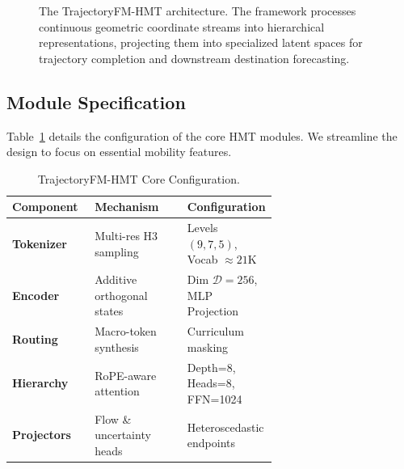 \documentclass{article}
\newcommand{\nodetitle}{\sffamily\bfseries\color{black!90}}
\newcommand{\nodecontent}{\sffamily\small\color{black!70}}
\begin{document}
\begin{figure}[t]
{
}
\caption{The TrajectoryFM-HMT architecture. The framework processes continuous geometric coordinate streams into hierarchical representations, projecting them into specialized latent spaces for trajectory completion and downstream destination forecasting.}
\label{fig:hmt_pipeline}
\end{figure}

\subsection{Module Specification}
Table~\ref{tab:model_spec} details the configuration of the core HMT modules. We streamline the design to focus on essential mobility features.

\begin{table}[h]
\centering
\small
\setlength{\tabcolsep}{5pt}
\renewcommand{\arraystretch}{1.2}
\caption{TrajectoryFM-HMT Core Configuration.}
\label{tab:model_spec}
\begin{tabular}{@{}lp{0.35\linewidth}p{0.3\linewidth}@{}}
\toprule
\textbf{Component} & \textbf{Mechanism} & \textbf{Configuration} \\
\midrule
\textbf{Tokenizer} & Multi-res H3 sampling & Levels $(9,7,5)$, Vocab $\approx 21$K \\
\textbf{Encoder} & Additive orthogonal states & Dim $\mathcal{D}=256$, MLP Projection \\
\textbf{Routing} & Macro-token synthesis & Curriculum masking \\
\textbf{Hierarchy} & RoPE-aware attention & Depth=8, Heads=8, FFN=1024 \\
\textbf{Projectors} & Flow \& uncertainty heads & Heteroscedastic endpoints \\
\bottomrule
\end{tabular}
\end{table}
\end{document}
